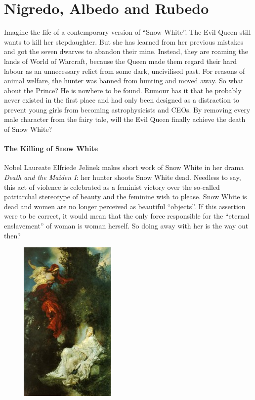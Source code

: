 \section{Nigredo, Albedo and Rubedo}
\label{sec:NigredoAlbedoandRubedo}

Imagine the life of a contemporary version of “Snow White”. The Evil Queen still wants to kill her stepdaughter. But she has learned from her previous mistakes and got the seven dwarves to abandon their mine. Instead, they are roaming the lands of World of Warcraft, because the Queen made them regard their hard labour as an unnecessary relict from some dark, uncivilised past. For reasons of animal welfare, the hunter was banned from hunting and moved away. So what about the Prince? He is nowhere to be found. Rumour has it that he probably never existed in the first place and had only been designed as a distraction to prevent young girls from becoming astrophysicists and CEOs. By removing every male character from the fairy tale, will the Evil Queen finally achieve the death of Snow White?

\paragraph{The Killing of Snow White}
Nobel Laureate Elfriede Jelinek makes short work of Snow White in her drama \emph{Death and the Maiden I}: her hunter shoots Snow White dead. Needless to say, this act of violence is celebrated as a feminist victory over the so-called patriarchal stereotype of beauty and the feminine wish to please. Snow White is dead and women are no longer perceived as beautiful “objects”. If this assertion were to be correct, it would mean that the only force responsible for the “eternal enslavement” of woman is woman herself. So doing away with her is the way out then?

\begin{figure}
\centering
 \includegraphics[scale=.6]{a20210127NigredoAlbedoandRubedo-img001.jpg} 
\end{figure}

